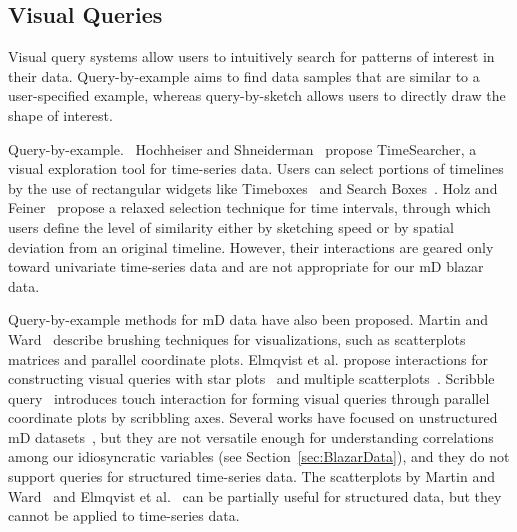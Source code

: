 \subsection{Visual Queries}\label{sec:relatedFeature}
Visual query systems allow users to intuitively search for patterns of interest in their data.
Query-by-example aims to find data samples that are similar to a user-specified example,
whereas query-by-sketch allows users to directly draw the shape of interest.

\textsf{Query-by-example.\ }
Hochheiser and Shneiderman~\cite{Hochheiser2004} propose TimeSearcher, a visual exploration tool for time-series data. Users can select portions of timelines by the use of rectangular widgets like Timeboxes~\cite{Buono2005} and Search Boxes~\cite{Buono2008}.
Holz and Feiner~\cite{Holz2009} propose a relaxed selection technique for time intervals, through which users define the level of similarity either by sketching speed or by spatial deviation from an original timeline. However, their interactions are geared only toward univariate time-series data and are not appropriate for our mD blazar data.
%

Query-by-example methods for mD data have also been proposed.
Martin and Ward~\cite{Martin2005} describe brushing techniques for visualizations,
such as scatterplots matrices and parallel coordinate plots.
Elmqvist et al. propose interactions for constructing visual queries with star plots~\cite{Elmqvist2007} and multiple scatterplots~\cite{Elmqvist2008}.
Scribble query~\cite{Nielsen2016} introduces touch interaction for forming visual queries
through parallel coordinate plots by scribbling axes. 
Several works have focused on unstructured mD datasets~\cite{Martin2005,Elmqvist2007,Nielsen2016}, 
but they are not versatile enough for understanding correlations among our idiosyncratic variables (see Section~\ref{sec:BlazarData}), and they do not support queries for structured time-series data.
The scatterplots by Martin and Ward~\cite{Martin2005} and Elmqvist et al.~\cite{Elmqvist2008} can be partially useful for structured data, but they cannot be applied to time-series data.


